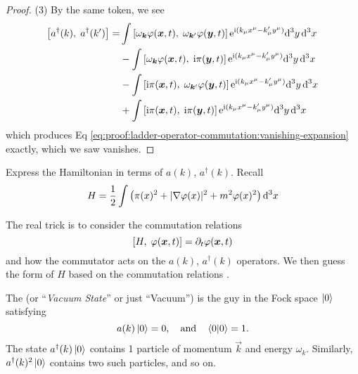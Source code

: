 \begin{proof}
(3) By the same token, we see
\begin{equation}
\begin{split}
\commutator{a^{\dagger}(k)}{a^{\dagger}(k')}
=&\int\commutator{\omega_{\vec{k}}\varphi(\vec{x},t)}{\omega_{\vec{k}'}\varphi(\vec{y},t)}\E^{\I (k_{\mu}x^{\mu}-k'_{\mu}y^{\mu})}\D^{3}y\,\D^{3}x\\
&-\int\commutator{\omega_{\vec{k}}\varphi(\vec{x},t)}{\I\pi(\vec{y},t)}\E^{\I (k_{\mu}x^{\mu}-k'_{\mu}y^{\mu})}\D^{3}y\,\D^{3}x\\
&-\int\commutator{\I\pi(\vec{x},t)}{\omega_{\vec{k}'}\varphi(\vec{y},t)}\E^{\I (k_{\mu}x^{\mu}-k'_{\mu}y^{\mu})}\D^{3}y\,\D^{3}x\\
&+\int\commutator{\I\pi(\vec{x},t)}{\I\pi(\vec{y},t)}\E^{\I (k_{\mu}x^{\mu}-k'_{\mu}y^{\mu})}\D^{3}y\,\D^{3}x
\end{split}
\end{equation}
which produces Eq
\eqref{eq:proof:ladder-operator-commutation:vanishing-expansion}
exactly, which we saw vanishes.
\end{proof}

\begin{xca}
Express the Hamiltonian in terms of $a(k)$, $a^{\dagger}(k)$. Recall
\begin{equation*}
H = \frac{1}{2}\int\left(\pi(x)^{2}+|\nabla\varphi(x)|^{2}+m^{2}\varphi(x)^{2}\right)\mathrm{d}^{3}x
\end{equation*}
\end{xca}
\begin{soln}
The real trick is to consider the commutation relations
\begin{equation}
\commutator{H}{\varphi(\vec{x}, t)}=\partial_{t}\varphi(\vec{x}, t)
\end{equation}
and how the commutator acts on the $a(k)$, $a^{\dagger}(k)$
operators. We then guess the form of $H$ based on the commutation
relations .
\end{soln}

The  (or ``\emph{Vacuum State}'' or just
``Vacuum'') is the guy in the Fock space $\ket{0}$ satisfying
\begin{equation}
a(k)\ket{0}=0,\quad\mbox{and}\quad \braket{0|0}=1.
\end{equation}
The state $a^{\dagger}(k)\ket{0}$ contains 1 particle of momentum
$\vec{k}$ and energy $\omega_{k}$. Similarly,
$a^{\dagger}(k)^{2}\ket{0}$ contains two such particles, and so
on.

